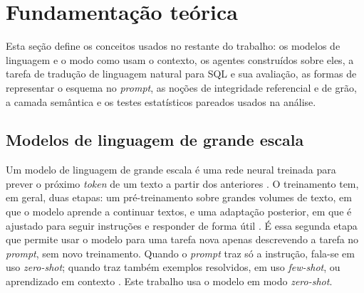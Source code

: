 \chapter{Fundamentação teórica}
\label{cap:fundamentacao}

Esta seção define os conceitos usados no restante do trabalho: os
modelos de linguagem e o modo como usam o contexto, os agentes construídos
sobre eles, a tarefa de tradução de linguagem natural para SQL e sua
avaliação, as formas de representar o esquema no \textit{prompt}, as
noções de integridade referencial e de grão, a camada semântica e os
testes estatísticos pareados usados na análise.

\section{Modelos de linguagem de grande escala}
\label{sec:llm}

Um modelo de linguagem de grande escala é uma rede neural treinada para
prever o próximo \textit{token} de um texto a partir dos anteriores
\cite{zhao2023survey}. O treinamento tem, em geral, duas etapas: um
pré-treinamento sobre grandes volumes de texto, em que o modelo aprende a
continuar textos, e uma adaptação posterior, em que é ajustado para seguir
instruções e responder de forma útil \cite{zhao2023survey}. É essa segunda
etapa que permite usar o modelo para uma tarefa nova apenas descrevendo a
tarefa no \textit{prompt}, sem novo treinamento. Quando o \textit{prompt}
traz só a instrução, fala-se em uso \textit{zero-shot}; quando traz também
exemplos resolvidos, em uso \textit{few-shot}, ou aprendizado em contexto
\cite{zhao2023survey}. Este trabalho usa o modelo em modo
\textit{zero-shot}.

